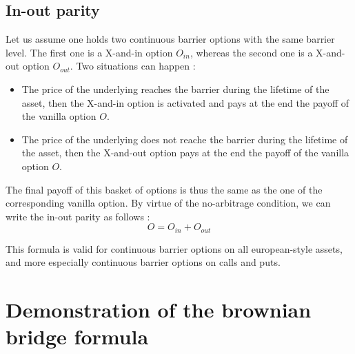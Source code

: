 \documentclass[a4paper,11pt,english]{book}
\begin{document}
\subsection{In-out parity}
Let us assume one holds two continuous barrier options with the same barrier level. The first one is a X-and-in option $O_{in}$, whereas the second one is a X-and-out option $O_{out}$. Two situations can happen : 
\begin{itemize}
    \item The price of the underlying reaches the barrier during the lifetime of the asset, then the X-and-in option is activated and pays at the end the payoff of the vanilla option $O$.
    \item The price of the underlying does not reache the barrier during the lifetime of the asset, then the X-and-out option pays at the end the payoff of the vanilla option $O$.
\end{itemize}

The final payoff of this basket of options is thus the same as the one of the corresponding vanilla option. By virtue of the no-arbitrage condition, we can write the in-out parity as follows : 
$$O = O_{in} + O_{out}$$

This formula is valid for continuous barrier options on all european-style assets, and more especially continuous barrier options on calls and puts.

\section{Demonstration of the brownian bridge formula}
\label{appendix:brownian-bridge}



\endgroup
\end{document}
